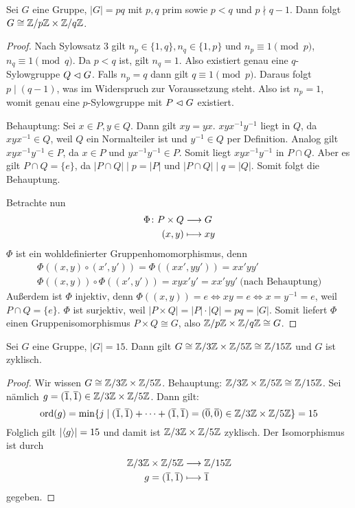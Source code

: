 \documentclass[12pt,a4paper]{scrartcl}
\begin{document}
\begin{satz}
	Sei $G$ eine Gruppe, $|G| = pq$ mit $p,q$ prim sowie $p<q$ und $p \nmid q-1$. Dann folgt $G\cong\mathbb Z/p\mathbb Z \times \mathbb Z/ q\mathbb Z$.
\end{satz}
\begin{proof}
	Nach Sylowsatz 3 gilt $n_p\in \{1,q\}, n_q\in\{1,p\}$ und $n_p\equiv 1\pmod p$, $n_q\equiv 1\pmod q$. Da $p<q$ ist, gilt $n_q = 1$. Also existiert genau eine $q$-Sylowgruppe $Q\vartriangleleft G$. Falls $n_p = q$ dann gilt $q\equiv 1\pmod p$. Daraus folgt $p\mid (q-1)$, was im Widerspruch zur Voraussetzung steht. Also ist $n_p = 1$, womit genau eine $p$-Sylowgruppe mit $P\vartriangleleft G$ existiert.
	
	Behauptung: Sei $x\in P ,y\in Q$. Dann gilt $xy = yx$. $xyx^{-1}y^{-1}$ liegt in $Q$, da $xyx^{-1}\in Q$, weil $Q$ ein Normalteiler ist und $y^{-1}\in Q$ per Definition. Analog gilt $xyx^{-1}y^{-1}\in P$, da $x\in P$ und $yx^{-1}y^{-1} \in P$.
	Somit liegt $xyx^{-1}y^{-1}$ in $P\cap Q$. Aber es gilt $P\cap Q = \{e\}$, da $|P\cap Q|\mid p = |P|$ und $|P\cap Q| \mid q = |Q|$. Somit folgt die Behauptung.
	
	Betrachte nun 
	\begin{align*}
		\Phi\colon P\times Q&\longrightarrow G\\
		 (x,y)&\longmapsto xy
	\end{align*}
	$\Phi$ ist ein wohldefinierter Gruppenhomomorphismus, denn 
	\begin{gather*}
		\Phi((x,y)\circ (x',y')) = \Phi ((xx', yy')) = xx'yy' \\ \Phi((x,y))\circ \Phi((x',y')) = xyx'y' = xx'yy' ~\text{(nach Behauptung)}
	\end{gather*}
	Außerdem ist $\Phi$ injektiv, denn $\Phi((x,y)) = e\Leftrightarrow xy = e\Leftrightarrow x = y^{-1} = e$, weil $P\cap Q = \{e\}$.
	$\Phi$ ist surjektiv, weil $|P\times Q| = |P|\cdot |Q| = pq = |G|$.
	Somit liefert $\Phi$ einen Gruppenisomorphismus $P\times Q \cong G$, also $\mathbb Z/p\mathbb Z\times \mathbb Z/q\mathbb Z\cong G$.
\end{proof}


\begin{kor}
	Sei $G$ eine Gruppe, $|G| = 15$. Dann gilt $G\cong \mathbb Z/3\mathbb Z\times \mathbb Z/5\mathbb Z \cong \mathbb Z/15\mathbb Z$ und $G$ ist zyklisch.
\end{kor}

\begin{proof}
	Wir wissen $G \cong \mathbb Z/3\mathbb Z\times \mathbb Z/5\mathbb Z$. Behauptung: $ \mathbb Z/3\mathbb Z\times \mathbb Z/5\mathbb Z\cong \mathbb Z/15\mathbb Z$. Sei nämlich $g = (\overline{1}, \overline{1})\in  \mathbb Z/3\mathbb Z\times \mathbb Z/5\mathbb Z$. Dann gilt: $$\operatorname{ord}(g) = \min \{j\mid (\overline{1},\overline{1})+\dots +(\overline{1},\overline{1}) = (\overline{0}, \overline{0})\in  \mathbb Z/3\mathbb Z\times \mathbb Z/5\mathbb Z\}  =15$$
	Folglich gilt $|\langle g\rangle| = 15$ und damit ist $\mathbb Z/3\mathbb Z\times \mathbb Z/5\mathbb Z$ zyklisch. Der Isomorphismus ist durch 
	\begin{align*} %
		\IZ/3\IZ\times \IZ/5\IZ&\longto \IZ/15\IZ\\
		g=(\overline{1},\overline{1})&\longmapsto \overline{1}
	\end{align*}
	gegeben.
\end{proof}
\end{document}
